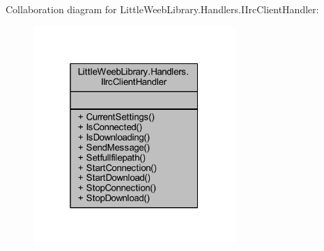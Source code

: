 Collaboration diagram for Little\+Weeb\+Library.\+Handlers.\+I\+Irc\+Client\+Handler\+:\nopagebreak
\begin{figure}[H]
\begin{center}
\leavevmode
\includegraphics[width=217pt]{interface_little_weeb_library_1_1_handlers_1_1_i_irc_client_handler__coll__graph}
\end{center}
\end{figure}
